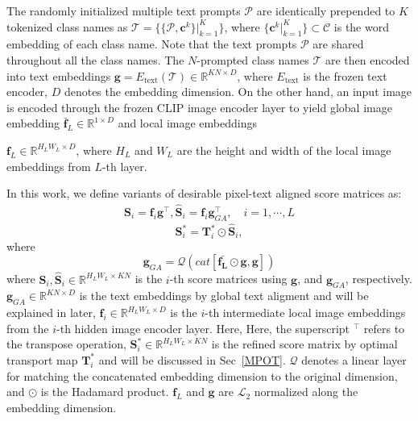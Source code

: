 \documentclass[nohyperref]{article}
\newcommand{\bs}{\boldsymbol}
\newcommand{\mc}{\mathcal}
\theoremstyle{plain}
\theoremstyle{definition}
\theoremstyle{remark}
\begin{document}
 The randomly initialized multiple text prompts $\mathcal{P}$ are identically prepended to $K$ tokenized class names as $\mathcal{T} = \{\{\mathcal{P}, \bs{c}^k\}|^K_{k=1}\}$, where $\{\bs{c}^k|_{k=1}^K\} \subset \mc{C}$ is the word embedding of each class name. Note that the text prompts $\mathcal{P}$ are shared throughout all the class names. The $N$-prompted class names $\mathcal{T}$ are then encoded into text embeddings $\bs{g} = E_{\text{text}}(\mathcal{T}) \in {\mathbb{R}^{KN \times D}}$, where $E_{\text{text}}$ is the frozen text encoder, $D$ denotes the embedding dimension. On the other hand, an input image is encoded through the frozen CLIP image encoder layer to yield global image embedding $\bs{\bar{f}}_L \in \mathbb{R}^{1 \times D}$ and local image embeddings {$\bs{f}_L \in \mathbb{R}^{H_LW_L \times D}$, where $H_{L}$ and $W_{L}$ are the height and width of the local image embeddings from $L$-th layer.


In this work, we define variants of desirable pixel-text aligned score matrices as: 
\begin{align}
	\bs{S}_i = \bs{f}_i \bs{g}^{\top},%
	\bs{\hat S}_i = \bs{f}_i {\bs{g}^{\top}_{GA}},\quad i=1,\cdots, L
	\label{eq:score}
\end{align} 
$$\bs{S}^{\ast}_i= \bs{T}^{\ast}_i \odot\bs{\hat S}_i,$$
where 
$$ \bs{g}_{GA} = \mathcal{Q} (cat\left[\bs{\bar{f_L}}  \odot \bs{{g}}, \bs{{g}} \right] )$$
where $\bs{S}_i, \bs{\hat S}_i \in \mathbb{R}^{H_LW_L \times KN}$ is the $i$-th score matrices using $\bs{g}$, and  $\bs{g}_{GA}$, respectively. $\bs{g}_{GA} \in \mathbb{R}^{KN \times D}$ is the text embeddings by global text aligment and will be explained in later, 
$\bs{f}_i \in \mathbb{R}^{H_LW_L \times D}$ is the $i$-th intermediate local image embeddings from the $i$-th hidden image encoder layer. Here, %
Here, the superscript $^{\top}$ refers to the transpose operation,
$\bs{S}^{\ast}_i \in \mathbb{R}^{H_LW_L \times KN}$ is the refined score matrix by optimal transport map $\bs{T}^{\ast}_i$ and will be discussed in Sec~\ref{MPOT}. $\mathcal{Q}$ denotes a linear layer for matching the concatenated embedding dimension to the original dimension, and $\odot$ is the Hadamard product. $\bs{f}_L$ and $\bs{g}$ are $\mathcal{L}_2$ normalized along the embedding dimension. 

}
\end{document}
